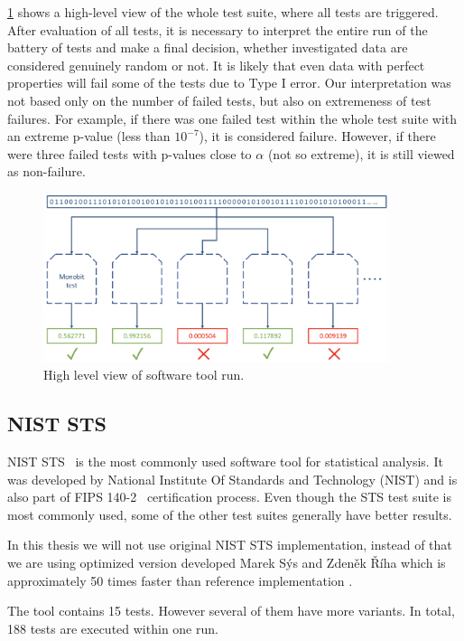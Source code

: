 \documentclass[
    digital,    %
    oneside,    %
    color,
    11pt,
    nocover,
    notable,
    nolof,
    nolot,
    final
]{fithesis3}
\renewcommand\_{\textunderscore\allowbreak}
\begin{document}
\cref{fig:whole-suite} shows a high-level view of the whole test suite, where all tests are triggered. After evaluation of all tests, it is necessary to interpret the entire run of the battery of tests and make a final decision, whether investigated data are considered genuinely random or not. It is likely that even data with perfect properties will fail some of the tests due to Type I error. Our interpretation was not based only on the number of failed tests, but also on extremeness of test failures. For example, if there was one failed test within the whole test suite with an extreme p-value (less than $10^{-7}$), it is considered failure. However, if there were three failed tests with p-values close to $\alpha$ (not so extreme), it is still viewed as non-failure.

\begin{figure}[h]
	\centering
	\includegraphics[width=0.9\textwidth]{./images/pictures/software-tool.png}
	\caption{High level view of software tool run.}
	\label{fig:whole-suite}
\end{figure}

\subsection{NIST STS}
{NIST STS}~\cite{nist-sts} is the most commonly used software tool for statistical analysis. It was developed by National Institute Of Standards and Technology (NIST) and is also part of FIPS 140-2~\cite{nist-fips-140-2} certification process. Even though the STS test suite is most commonly used, some of the other test suites generally have better results.

In this thesis we will not use original NIST STS implementation, instead of that we are using optimized version developed Marek Sýs and Zdeněk Říha which is approximately 50 times faster than reference implementation \cite{Sys:2016:A9O:2988516.2988228}. 

The tool contains 15 tests. However several of them have more variants. In total, 188 tests are executed within one run.
\end{document}
